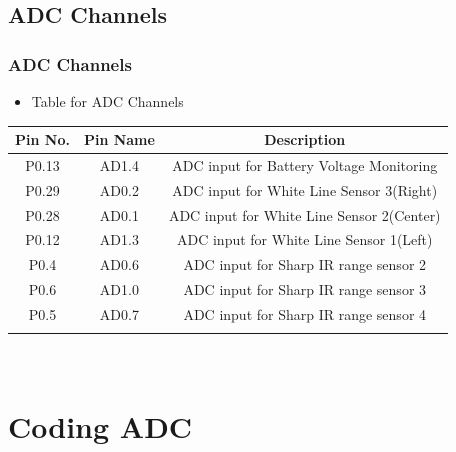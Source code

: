\documentclass[table,10pt,red]{beamer}
\begin{document}
\subsection{ADC Channels}
\begin{frame}[shrink=2]
	\frametitle{ADC Channels}
	\begin{itemize}
		\item Table for ADC Channels \\[20pt]
	\end{itemize}
	\begin{tabular}{!{\vrule width 2pt}c|c|c!{\vrule width 2pt}}
		\textbf{Pin No.}&\textbf{Pin Name}&\textbf{Description}	\\
		\hline
		P0.13&AD1.4&ADC input for Battery Voltage Monitoring	\\
		\hline
		P0.29&AD0.2&ADC input for White Line Sensor 3(Right)	\\
		\hline
		P0.28&AD0.1&ADC input for White Line Sensor 2(Center)	\\
		\hline
		P0.12&AD1.3&ADC input for White Line Sensor 1(Left)	\\
		\hline
		P0.4&AD0.6&ADC input for Sharp IR range sensor 2	\\
		\hline
		P0.6&AD1.0&ADC input for Sharp IR range sensor 3	\\
		\hline
		P0.5&AD0.7&ADC input for Sharp IR range sensor 4	\\
		\hline
	\end{tabular} \pause \\[10pt]
\end{frame}


\section{Coding ADC}
\end{document}
